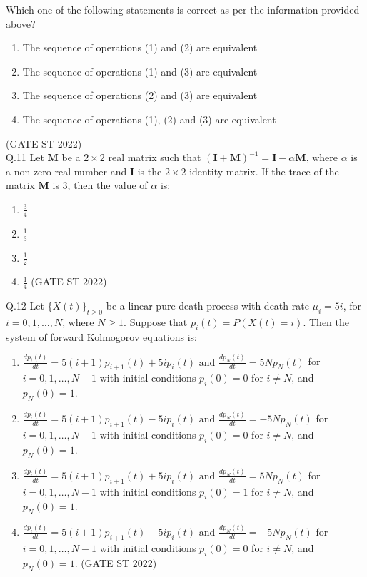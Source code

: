 \documentclass[journal,12pt,onecolumn]{IEEEtran}
\theoremstyle{remark}
\begin{document}
	 Which one of the following statements is correct as per the information provided above?\\[0.5em]
	 \begin{enumerate}[label=(\Alph*)]
	 	\item The sequence of operations (1) and (2) are equivalent
	 	\item The sequence of operations (1) and (3) are equivalent
	 	\item The sequence of operations (2) and (3) are equivalent
	 	\item The sequence of operations (1), (2) and (3) are equivalent
	 \end{enumerate}
	 \hfill (GATE ST 2022)
	 \vspace{2em}
	 \\
Q.11 Let $\mathbf{M}$ be a $2 \times 2$ real matrix such that 
$(\mathbf{I} + \mathbf{M})^{-1} = \mathbf{I} - \alpha \mathbf{M}$, 
where $\alpha$ is a non-zero real number and $\mathbf{I}$ is the $2 \times 2$ identity matrix. 
If the trace of the matrix $\mathbf{M}$ is $3$, then the value of $\alpha$ is:
\begin{enumerate}[label=\alph*.] 
	\item $\frac{3}{4}$
	\item $\frac{1}{3}$
	\item $\frac{1}{2}$
	\item $\frac{1}{4}$
	\hfill (GATE ST 2022)
\end{enumerate}
	\vspace{2em}
Q.12 Let $ \{X(t)\}_{t\geq0} $ be a linear pure death process with death rate $\mu_i = 5i$, for $i = 0, 1, \dots , N$, where $N \geq 1$. Suppose that $p_i(t) = P(X(t) = i)$. Then the system of forward Kolmogorov equations is:
\begin{enumerate}[label=\alph*.] 
	\item $ \frac{dp_i(t)}{dt} = 5(i + 1)p_{i+1}(t) + 5i p_i(t) \text{ and } \frac{dp_N(t)}{dt} = 5Np_N(t)$ for $i = 0,1, \dots ,N - 1$ with initial conditions $p_i(0) = 0$ for $i \neq N $, and $p_N(0) = 1$.
	\item $ \frac{dp_i(t)}{dt} = 5(i + 1)p_{i+1}(t) - 5i p_i(t) \text{ and } \frac{dp_N(t)}{dt} = -5Np_N(t)$ for $i = 0,1, \dots ,N - 1$ with initial conditions $p_i(0) = 0$ for $i \neq N $, and $p_N(0) = 1$.
	\item $ \frac{dp_i(t)}{dt} = 5(i + 1)p_{i+1}(t) + 5i p_i(t) \text{ and } \frac{dp_N(t)}{dt} = 5Np_N(t)$ for $i = 0,1, \dots ,N - 1$ with initial conditions $p_i(0) = 1$ for $i \neq N $, and $p_N(0) = 1$.
	\item $ \frac{dp_i(t)}{dt} = 5(i + 1)p_{i+1}(t) - 5i p_i(t) \text{ and } \frac{dp_N(t)}{dt} = -5Np_N(t)$ for $i = 0,1, \dots ,N - 1$ with initial conditions $p_i(0) = 0$ for $i \neq N $, and $p_N(0) = 1$.
	\hfill (GATE ST 2022)
\end{enumerate}
\end{document}

